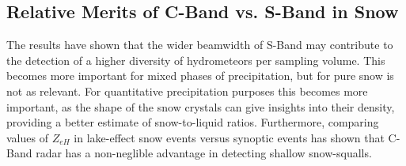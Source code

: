 \subsection{Relative Merits of C-Band vs. S-Band in Snow}
The results have shown that the wider beamwidth of S-Band may contribute to the detection of a higher diversity of hydrometeors per sampling volume. This
becomes more important for mixed phases of precipitation, but for pure snow is not as relevant. For quantitative precipitation purposes this becomes more
important, as the shape of the snow crystals can give insights into their density, providing a better estimate of snow-to-liquid ratios. Furthermore,
comparing values of $Z_{eH}$ in lake-effect snow events versus synoptic events has shown that C-Band radar has a non-neglible advantage in detecting shallow snow-squalls.

